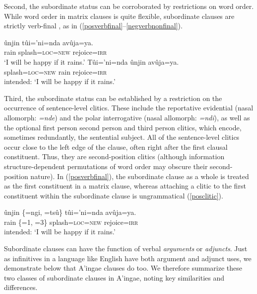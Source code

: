 \documentclass[output=paper,colorlinks,citecolor=brown]{langscibook}
\begin{document}
Second, the subordinate status can be corroborated by restrictions on word order. While word order in matrix clauses is quite flexible, subordinate clauses are strictly verb-final \citep{fischerhengeveld, fischer2011cofan}, as in (\ref{posverbfinal}--\ref{negverbnonfinal}).
\begin{exe}
    \ex \label{posverbfinal}
    \gll {\ob}ûnjin tûi='ni={nda{\cb}} avûja=ya. \\
         rain  splash=\textsc{loc=new} rejoice=\textsc{irr} \\
    \glt `I will be happy if it rains.'
    \ex \label{negverbnonfinal}
    \gll \bad{\ob}Tûi='ni=nda {ûnjin{\cb}} avûja=ya. \\
         splash=\textsc{loc=new} rain  rejoice=\textsc{irr} \\
    \glt intended: `I will be happy if it rains.'
\end{exe}

Third, the subordinate status can be established by a restriction on the occurrence of sentence-level clitics. These include the reportative evidential  (nasal allomorph: \emph{=nde}) and the polar interrogative  (nasal allomorph: \emph{=ndi}), as well as the optional first person  second person  and third person  clitics, which encode, sometimes redundantly, the sentential subject. All of the sentence-level clitics occur close to the left edge of the clause, often right after the first clausal constituent. Thus, they are second-position clitics (although information structure-dependent permutations of word order may obscure their second-position nature). In (\ref{posverbfinal}), the subordinate clause as a whole is treated as the first constituent in a matrix clause, whereas attaching a clitic to the first constituent within the subordinate clause is ungrammatical (\ref{posclitic}).

    \ea \label{posclitic}
    \gll \bad{\ob}ûnjin {\rm\{}=ngi, =tsû{\rm\}} {tûi='ni=nda{\cb}} avûja=ya. \\
         rain {\rm\{}\textsc{=}1, \textsc{=}3{\rm\}}  splash=\textsc{loc=new} rejoice=\textsc{irr} \\
    \glt intended: `I will be happy if it rains.'
    \z 



Subordinate clauses can have the function of verbal \textit{arguments} or \textit{adjuncts}. Just as infinitives in a language like English have both argument and adjunct uses, we demonstrate below that A'ingae  clauses do too. We therefore summarize these two classes of subordinate clauses in A'ingae, noting key similarities and differences.
\end{document}
